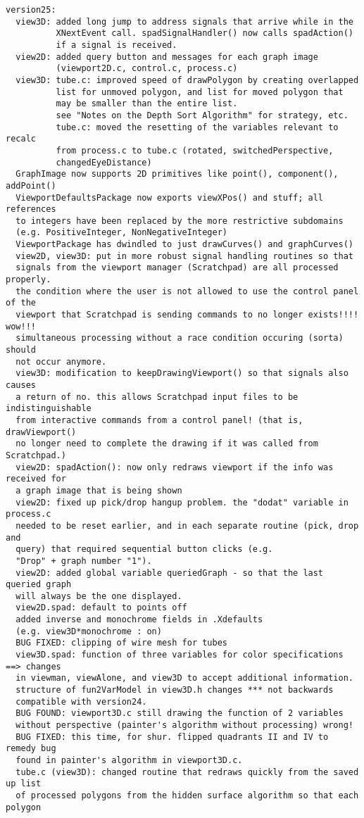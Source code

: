 \documentclass{article}
\begin{document}
\begin{verbatim}
version25:
  view3D: added long jump to address signals that arrive while in the
          XNextEvent call. spadSignalHandler() now calls spadAction()
          if a signal is received.
  view2D: added query button and messages for each graph image
          (viewport2D.c, control.c, process.c)
  view3D: tube.c: improved speed of drawPolygon by creating overlapped
          list for unmoved polygon, and list for moved polygon that
          may be smaller than the entire list.
          see "Notes on the Depth Sort Algorithm" for strategy, etc.
          tube.c: moved the resetting of the variables relevant to recalc
          from process.c to tube.c (rotated, switchedPerspective,
          changedEyeDistance)
  GraphImage now supports 2D primitives like point(), component(), addPoint()
  ViewportDefaultsPackage now exports viewXPos() and stuff; all references
  to integers have been replaced by the more restrictive subdomains
  (e.g. PositiveInteger, NonNegativeInteger)
  ViewportPackage has dwindled to just drawCurves() and graphCurves()
  view2D, view3D: put in more robust signal handling routines so that
  signals from the viewport manager (Scratchpad) are all processed properly.
  the condition where the user is not allowed to use the control panel of the
  viewport that Scratchpad is sending commands to no longer exists!!!! wow!!!
  simultaneous processing without a race condition occuring (sorta) should
  not occur anymore.
  view3D: modification to keepDrawingViewport() so that signals also causes
  a return of no. this allows Scratchpad input files to be indistinguishable
  from interactive commands from a control panel! (that is, drawViewport()
  no longer need to complete the drawing if it was called from Scratchpad.)
  view2D: spadAction(): now only redraws viewport if the info was received for
  a graph image that is being shown
  view2D: fixed up pick/drop hangup problem. the "dodat" variable in process.c
  needed to be reset earlier, and in each separate routine (pick, drop and
  query) that required sequential button clicks (e.g.
  "Drop" + graph number "1").
  view2D: added global variable queriedGraph - so that the last queried graph
  will always be the one displayed.
  view2D.spad: default to points off
  added inverse and monochrome fields in .Xdefaults
  (e.g. view3D*monochrome : on)
  BUG FIXED: clipping of wire mesh for tubes
  view3D.spad: function of three variables for color specifications ==> changes
  in viewman, viewAlone, and view3D to accept additional information.
  structure of fun2VarModel in view3D.h changes *** not backwards
  compatible with version24.
  BUG FOUND: viewport3D.c still drawing the function of 2 variables
  without perspective (painter's algorithm without processing) wrong!
  BUG FIXED: this time, for shur. flipped quadrants II and IV to remedy bug
  found in painter's algorithm in viewport3D.c.
  tube.c (view3D): changed routine that redraws quickly from the saved up list
  of processed polygons from the hidden surface algorithm so that each polygon


\end{verbatim}
\end{document}
